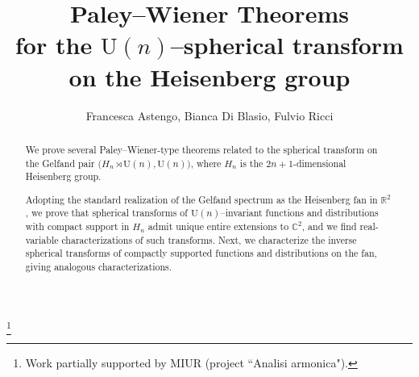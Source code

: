 \documentclass[12pt,a4paper]{amsart}
\theoremstyle{plain}
\theoremstyle{definition}
\numberwithin{equation}{section}
\begin{document}
\title[Paley--Wiener Theorems on the Heisenberg group]
{Paley--Wiener Theorems \\for the ${{\text{U}({n})}}$--spherical transform \\on the Heisenberg group}

\author[F. Astengo, B. Di Blasio, F. Ricci]
{Francesca Astengo, Bianca Di Blasio, Fulvio Ricci}

\address
{Dipartimento di Matematica\\
Via Dodecaneso 35\\
16146 Genova\\ Italy} 

\address
{Dipartimento di Matematica e Applicazioni\\
Via Cozzi 53\\
  20125 Milano\\ Italy}

\address
{Scuola Normale Superiore\\
Piazza dei Cavalieri 7\\
56126 Pisa\\ Italy}

\thanks{Work partially supported
by  MIUR (project ``Analisi armonica").
}



\begin{abstract}
 We prove several Paley--Wiener-type theorems related to the spherical transform
on the Gelfand pair $\big({{H_{n}}}\rtimes{{\text{U}({n})}},{{\text{U}({n})}}\big)$, where  ${{H_{n}}}$ is the 
$2{n}+1$-dimensional Heisenberg group. 

Adopting the standard realization of the Gelfand spectrum as the Heisenberg fan in ${\mathbb R}^2$, 
we prove that spherical transforms of ${{\text{U}({n})}}$--invariant functions and distributions 
with compact support in ${{H_{n}}}$ admit unique entire extensions to ${\mathbb C}^2$, 
and we find  real-variable characterizations of such transforms.
Next, we characterize the inverse spherical transforms of compactly supported functions 
and distributions on the fan, giving analogous characterizations. 
\end{abstract}

\maketitle
\end{document}
